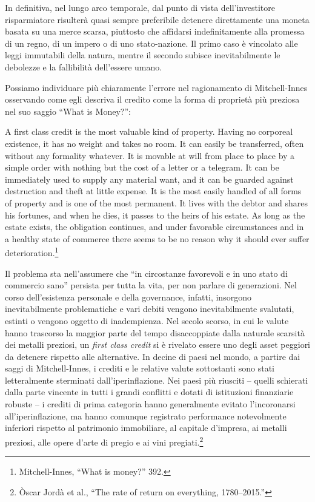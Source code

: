 \documentclass[
  a5paper,
  smalldemyvopaper,10pt,twoside,onecolumn,openright,extrafontsizes,hidelinks]{memoir}
\renewenvironment{quote}%
               {\list{}{\rightmargin=.6cm\leftmargin=.6cm}%
                \itshape \item[]}%
               {\endlist}
\begin{document}
In definitiva, nel lungo arco temporale, dal punto di vista
dell'investitore risparmiatore risulterà quasi sempre preferibile
detenere direttamente una moneta basata su una merce scarsa, piuttosto
che affidarsi indefinitamente alla promessa di un regno, di un impero o
di uno stato-nazione. Il primo caso è vincolato alle leggi immutabili
della natura, mentre il secondo subisce inevitabilmente le debolezze e
la fallibilità dell'essere umano.

Possiamo individuare più chiaramente l'errore nel ragionamento di
Mitchell-Innes osservando come egli descriva il credito come la forma di
proprietà più preziosa nel suo saggio ``What is Money?'':

\begin{quote}
A first class credit is the most valuable kind of property. Having no
corporeal existence, it has no weight and takes no room. It can easily
be transferred, often without any formality whatever. It is movable at
will from place to place by a simple order with nothing but the cost of
a letter or a telegram. It can be immediately used to supply any
material want, and it can be guarded against destruction and theft at
little expense. It is the most easily handled of all forms of property
and is one of the most permanent. It lives with the debtor and shares
his fortunes, and when he dies, it passes to the heirs of his estate. As
long as the estate exists, the obligation continues, and under favorable
circumstances and in a healthy state of commerce there seems to be no
reason why it should ever suffer deterioration.\footnote{Mitchell-Innes,
  ``What is money?'' 392.}
\end{quote}

Il problema sta nell'assumere che ``in circostanze favorevoli e in uno
stato di commercio sano'' persista per tutta la vita, per non parlare di
generazioni. Nel corso dell'esistenza personale e della governance,
infatti, insorgono inevitabilmente problematiche e vari debiti vengono
inevitabilmente svalutati, estinti o vengono oggetto di inadempienza.
Nel secolo scorso, in cui le valute hanno trascorso la maggior parte del
tempo disaccoppiate dalla naturale scarsità dei metalli preziosi, un
\emph{first class credit} si è rivelato essere uno degli asset peggiori
da detenere rispetto alle alternative. In decine di paesi nel mondo, a
partire dai saggi di Mitchell-Innes, i crediti e le relative valute
sottostanti sono stati letteralmente sterminati dall'iperinflazione. Nei
paesi più riusciti -- quelli schierati dalla parte vincente in tutti i
grandi conflitti e dotati di istituzioni finanziarie robuste -- i
crediti di prima categoria hanno generalmente evitato l'incoronarsi
all'iperinflazione, ma hanno comunque registrato performance
notevolmente inferiori rispetto al patrimonio immobiliare, al capitale
d'impresa, ai metalli preziosi, alle opere d'arte di pregio e ai vini
pregiati.\footnote{Òscar Jordà et al., ``The rate of return on
  everything, 1780--2015.''}
\end{document}
